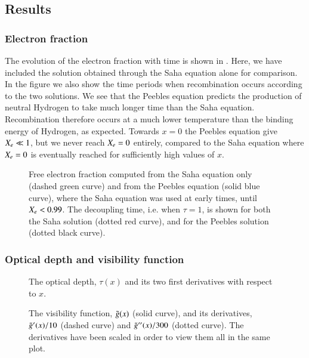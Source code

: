 \subsection{Results}\label{ssec:M2:results}


\subsubsection{Electron fraction} \label{sssec:M2:results:electron_fraction}
The evolution of the electron fraction  with time is shown in . Here, we have included the solution obtained through the Saha equation alone for comparison. In the figure we also show the time periods when recombination occurs according to the two solutions. We see that the Peebles equation predicts the production of neutral Hydrogen to take much longer time than the Saha equation. Recombination therefore occurs at a much lower temperature than the binding energy of Hydrogen, as expected. Towards $x=0$ the Peebles equation give $X_e\ll1$, but we never reach $X_e=0$ entirely, compared to the Saha equation where $X_e=0$ is eventually reached for sufficiently high values of $x$. 

\begin{figure}[ht!]
    \caption{Free electron fraction computed from the Saha equation only (dashed green curve) and from the Peebles equation (solid blue curve), where the Saha equation was used at early times, until $X_e<0.99$. The decoupling time, i.e. when $\tau=1$, is shown for both the Saha solution (dotted red curve), and for the Peebles solution (dotted black curve).}
    \label{fig:M2:results:decoupling_compare_Xe_peebles_saha}
\end{figure}

\subsubsection{Optical depth and visibility function} \label{sssec:M2:results:optical_depth_and_visibility_function}
\begin{figure}[ht!]
    \caption{The optical depth, $\tau(x)$ and its two first derivatives with respect to $x$.}
    \label{fig:M2:results:tau_plot}
\end{figure}


\begin{figure}[ht!]
    \caption{The visibility function, $\tilde{g}(x)$ (solid curve), and its derivatives, $\tilde{g}'(x)/10$ (dashed curve) and $\tilde{g}''(x)/300$ (dotted curve). The derivatives have been scaled in order to view them all in the same plot.}
    \label{fig:M2:results:g_plot}
\end{figure}

